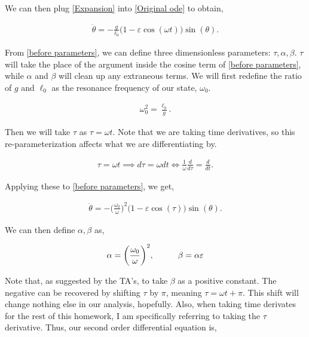 \documentclass[12pt]{article}
\newcommand{\ep}{\varepsilon}
\begin{document}
\begin{enumerate}[]
\begin{solution}
        We can then plug \ref{Expansion} into \ref{Original ode} to obtain,

        \begin{align}
            \ddot{\theta} = -\frac{g}{\ell_0}\Big(1 - \ep \cos(\omega t)\Big)\sin(\theta). \label{before parameters}
        \end{align}

        From \ref{before parameters}, we can define three dimensionless parameters: $\tau, \alpha, \beta$. $\tau$ will take the place of the argument inside the cosine term of \ref{before parameters}, while $\alpha$ and $\beta$ will clean up any extraneous terms. We will first redefine the ratio of $g$ and $\ell_0$ as the resonance frequency of our state, $\omega_0$.
        
        \begin{align*}
            \omega_0^2 = \frac{\ell_0}{g}.    
        \end{align*}

        Then we will take $\tau$ as $\tau = \omega t$. Note that we are taking time derivatives, so this re-parameterization affects what we are differentiating by. 

        \begin{align*}
            \tau = \omega t \implies d\tau = \omega dt \iff \frac{1}{\omega}\frac{d}{d\tau} = \frac{d}{dt}.
        \end{align*}

        Applying these to \ref{before parameters}, we get,

        \begin{align}
            \ddot{\theta} = -\Big(\frac{\omega_0}{\omega} \Big)^2 \big( 1 - \ep \cos(\tau) \big) \sin(\theta).  \label{before alphabeta}
        \end{align}

        We can then define $\alpha, \beta$ as,

        \begin{align}
            \alpha = \bigg(\frac{\omega_0}{\omega}\bigg)^2, \hspace{10mm} \beta = \alpha\ep
        \end{align}

        Note that, as suggested by the TA's, to take $\beta$ as a positive constant. The negative can be recovered by shifting $\tau$ by $\pi$, meaning $\tau = \omega t + \pi$. This shift will change nothing else in our analysis, hopefully. Also, when taking time derivates for the rest of this homework, I am specifically referring to taking the $\tau$ derivative. Thus, our second order differential equation is, 


\end{solution}
\end{enumerate}
\end{document}
